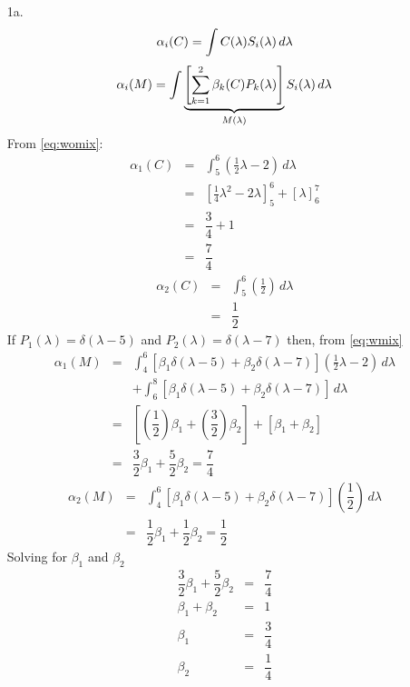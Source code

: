 \documentclass[10pt, a4paper]{article}
\begin{document}

\begin{enumerate}
  \item[1a. ]
        \begin{equation} \label{eq:womix}
          \alpha_i(C) = \int C(\lambda) S_{i}(\lambda)\, d\lambda \\
        \end{equation}
        \begin{equation} \label{eq:wmix}
          \alpha_i(M) = \int \underbrace{\left[\sum_{k=1}^{2}\beta_{k}(C)P_{k}(\lambda) \right]}_{M(\lambda)}S_i(\lambda)\, d\lambda \\
        \end{equation}
        From \eqref{eq:womix}:
        \begin{eqnarray}
          \alpha_1(C) &=& \int^{6}_{5} \left( \frac{1}{2}\lambda -2 \right) \, d\lambda \\
          &=& \left[\frac{1}{4}\lambda^{2} - 2\lambda \right]^{6}_{5} + \left[\lambda \right]^{7}_{6} \\
          &=& \dfrac{3}{4} + 1 \\
          &=& \dfrac{7}{4}
        \end{eqnarray}
        \begin{eqnarray}
          \alpha_2(C) &=& \int^6_5 \left(\frac{1}{2}\right) \, d\lambda \\
          &=& \dfrac{1}{2}
        \end{eqnarray}
        If
        $P_1(\lambda) = \delta (\lambda-5)$
        and
        $P_2(\lambda) = \delta (\lambda-7)$
        then, from \eqref{eq:wmix}
        \begin{eqnarray}
          \alpha_1(M) &=& \int^6_4 \left[\beta_1\delta(\lambda-5) + \beta_2\delta(\lambda-7)\right]\left(\frac{1}{2}\lambda-2\right)\,
          d\lambda \\
          && + \int^8_6\left[\beta_1\delta(\lambda-5) + \beta_2\delta(\lambda-7)\right]\,d\lambda \nonumber \\
          &=& \left[\left(\dfrac{1}{2}\right)\beta_1 + \left(\dfrac{3}{2}\right)\beta_2\right] + \left[\beta_1 + \beta_2 \right] \\
          &=& \dfrac{3}{2}\beta_1 + \dfrac{5}{2}\beta_2 = \dfrac{7}{4}
        \end{eqnarray}
        \begin{eqnarray}
          \alpha_2(M) &=& \int^6_4\left[\beta_1\delta(\lambda-5) + \beta_2\delta(\lambda-7)\right]\left(\dfrac{1}{2}\right)\,d\lambda \\
          &=& \dfrac{1}{2}\beta_1 + \dfrac{1}{2}\beta_2 = \dfrac{1}{2}
        \end{eqnarray}
        Solving for $\beta_1$ and $\beta_2$
        \begin{eqnarray}
          \dfrac{3}{2}\beta_1 + \dfrac{5}{2}\beta_2 &=& \dfrac{7}{4} \\  
          \beta_1 + \beta_2 &=& 1 \\
          \beta_1 &=& \dfrac{3}{4} \\
          \beta_2 &=& \dfrac{1}{4}
        \end{eqnarray}
\end{enumerate}
\end{document}
